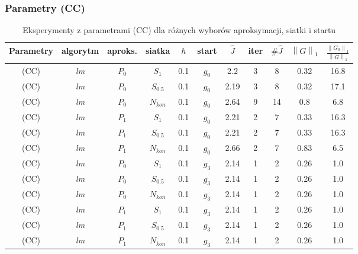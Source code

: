 \documentclass[11pt]{article}
\newcommand{\norm}[1]{\left\lVert#1\right\rVert}
\begin{document}
\subsubsection{Parametry (CC)}

\begin{table}[h]
  \begin{center}
    \begin{tabular}{|c|c|c|c|c|c|c|c|c|c|c|}
      \hline
      Parametry & algorytm & aproks. & siatka & $h$ & start & $\hat{J}$ & iter & $\#\hat{J}$ & $\norm{G}_1$ & $\frac{\norm{G_0}_1}{\norm{G}_1}$ \\
      \hline
      (CC) & {\it lm\/} & $P_0$ & $S_1$ & 0.1 & $g_0$ & 2.2 & 3 & 8 & 0.32 & 16.8 \\
      \hline
      (CC) & {\it lm\/} & $P_0$ & $S_{0.5}$ & 0.1 & $g_0$ & 2.19 & 3 & 8 & 0.32 & 17.1 \\
      \hline
      (CC) & {\it lm\/} & $P_0$ & $N_{kon}$ & 0.1 & $g_0$ & 2.64 & 9 & 14 & 0.8 & 6.8 \\
      \hline
      (CC) & {\it lm\/} & $P_1$ & $S_1$ & 0.1 & $g_0$ & 2.21 & 2 & 7 & 0.33 & 16.3 \\
      \hline
      (CC) & {\it lm\/} & $P_1$ & $S_{0.5}$ & 0.1 & $g_0$ & 2.21 & 2 & 7 & 0.33 & 16.3 \\
      \hline
      (CC) & {\it lm\/} & $P_1$ & $N_{kon}$ & 0.1 & $g_0$ & 2.66 & 2 & 7 & 0.83 & 6.5 \\
      \hline
      (CC) & {\it lm\/} & $P_0$ & $S_1$ & 0.1 & $g_3$ & 2.14 & 1 & 2 & 0.26 & 1.0 \\
      \hline
      (CC) & {\it lm\/} & $P_0$ & $S_{0.5}$ & 0.1 & $g_3$ & 2.14 & 1 & 2 & 0.26 & 1.0 \\
      \hline
      (CC) & {\it lm\/} & $P_0$ & $N_{kon}$ & 0.1 & $g_3$ & 2.14 & 1 & 2 & 0.26 & 1.0 \\
      \hline
      (CC) & {\it lm\/} & $P_1$ & $S_1$ & 0.1 & $g_3$ & 2.14 & 1 & 2 & 0.26 & 1.0 \\
      \hline
      (CC) & {\it lm\/} & $P_1$ & $S_{0.5}$ & 0.1 & $g_3$ & 2.14 & 1 & 2 & 0.26 & 1.0 \\
      \hline
      (CC) & {\it lm\/} & $P_1$ & $N_{kon}$ & 0.1 & $g_3$ & 2.14 & 1 & 2 & 0.26 & 1.0 \\
      \hline
    \end{tabular}
    \caption{Eksperymenty z parametrami (CC) dla różnych wyborów aproksymacji, siatki i startu}\label{param1_tbl}
  \end{center}
\end{table}
\end{document}
